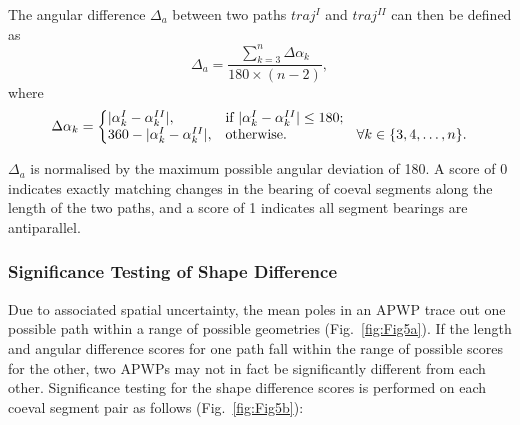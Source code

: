 The angular difference $\Delta_a$ between two paths $traj^I$ and $traj^{II}$ can
then be defined as
%
\begin{equation*}
  \Delta_a = \frac{\sum\limits_{k=3}^n \Delta\alpha_k}{180\times(n-2)},
\label{eq:ad}
\end{equation*}
%
where
%
\begin{equation*}
\Delta\alpha_k =
\left\{
\begin{array}{@{}ll@{}}
| \alpha_k^I - \alpha_k^{II} |, & \text{if}\ | \alpha_k^I -
\alpha_k^{II} | \leq180; \\
360 - | \alpha_k^I - \alpha_k^{II} |, &
  \text{otherwise}.\quad\quad\quad\quad\quad\forall k \in \{3,4,\ldots,n\}.
\end{array}
\right.\label{eq:diffAziChange}
\end{equation*}

$\Delta_a$ is normalised by the maximum possible angular deviation of
180\degree. A score of 0 indicates exactly matching changes in the bearing of
coeval segments along the length of the two paths, and a score of 1 indicates
all segment bearings are antiparallel.

\subsubsection{Significance Testing of Shape Difference}\label{sec:shapeSigTest}

Due to associated spatial uncertainty, the mean poles in an APWP trace out one
possible path within a range of possible geometries (Fig.~\ref{fig:Fig5a}). If
the length and angular difference scores for one path fall within the range of
possible scores for the other, two APWPs may not in fact be significantly
different from each other. Significance testing for the shape difference scores
is performed on each coeval segment pair as follows (Fig.~\ref{fig:Fig5b}):

